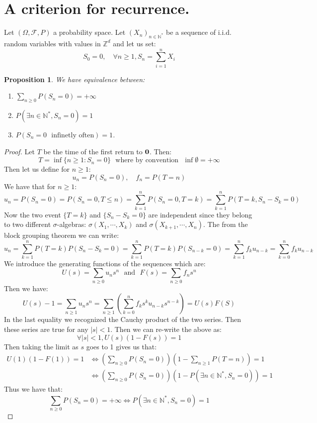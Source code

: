 \documentclass[10pt,a4paper]{book}
\newtheorem{proposition}{Proposition}[section]
\theoremstyle{definition}
\begin{document}
\section{A criterion for recurrence.}

Let $(\Omega, \mathcal{F}, P)$ a probability space. Let $(X_n)_{n \in \mathbb{N}^*}$ be a sequence of i.i.d. random variables with values in $\mathbb{Z}^d$ and let us set:
\[
S_0 = 0, \quad \forall n \geq 1, S_n = \sum_{i = 1}^{n} X_i
\]

\begin{proposition}
We have equivalence between:
\begin{enumerate}
\item $\sum_{n \geq 0} P(S_n = 0) = +\infty$
\item $P(\exists n \in \mathbb{N}^*, S_n = 0) = 1$
\item $P(S_n = 0 \mbox{~~infinetly often}) = 1$. 
\end{enumerate}
\end{proposition}

\begin{proof}

Let $T$ be the time of the first return to $\vb{0}$. Then:
\[
T = \inf \{ n \geq 1 : S_n = 0\} \mbox{~~where by convention~~} \inf \emptyset = +\infty
\]
Then let us define for $n\geq 1$:
\[
u_n = P(S_n = 0), \quad f_n = P(T = n)
\]
We have that for $n \geq 1$:
\[
u_n = P(S_n = 0) = P(S_n = 0, T \leq n) = \sum_{k = 1}^n P(S_n = 0, T = k) = \sum_{k = 1}^n P(T = k, S_n - S_k = 0)
\]
Now the two event $\{T = k\}$ and $\{S_n - S_k = 0\}$ are independent since they belong to two different $\sigma$-algebras: $\sigma(X_1, \cdots, X_k)$ and $\sigma(X_{k+1}, \cdots, X_n)$. The from the block grouping theorem we can write:
\[
u_n = \sum_{k = 1}^n P(T = k) P(S_n - S_k = 0) = \sum_{k = 1}^n P(T = k) P(S_{n - k} = 0) = \sum_{k = 1}^n f_k u_{n - k} = \sum_{k = 0}^n f_k u_{n-k}
\]
We introduce the generating functions of the sequences which are:
\[
U(s) = \sum_{n \geq 0} u_n s^n \mbox{~~and~~} F(s) = \sum_{n \geq 0} f_n s^n
\]
Then we have:
\[
U(s) - 1 = \sum_{n \geq 1} u_n s^n = \sum_{n \geq 1} \left(\sum_{k = 0}^n f_k s^k u_{n - k} s^{n - k}\right) = U(s)F(S)
\]
In the last equality we recognized the Cauchy product of the two series. Then these series are true for any $|s| < 1$. Then we can re-write the above as:
\[
\forall |s| < 1, U(s) (1 - F(s)) = 1
\] 
Then taking the limit as $s$ goes to 1 gives us that:
\begin{align*}
U(1) (1 - F(1)) = 1 &\Leftrightarrow \left( \sum_{n \geq 0} P(S_n = 0) \right) \left(1 - \sum_{n \geq 1} P(T = n)\right) = 1 \\
&\Leftrightarrow \left( \sum_{n \geq 0} P(S_n = 0) \right) \left(1 - P(\exists n \in \mathbb{N}^*, S_n = 0) \right) = 1
\end{align*}
Thus we have that:
\[
\sum_{n \geq 0} P(S_n = 0) = +\infty \Leftrightarrow P(\exists n \in \mathbb{N}^*, S_n = 0) = 1
\]
\end{proof}
\end{document}
